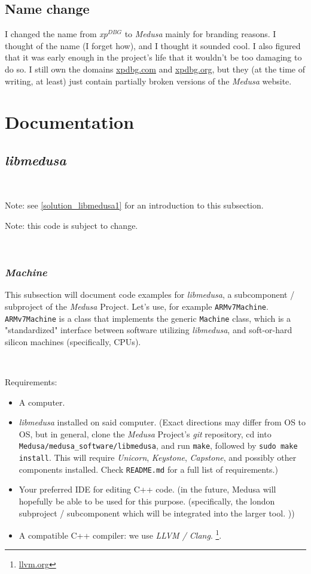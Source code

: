 \documentclass{report}
\newcommand{\xpDBG}{\textit{xp$^{DBG}$}\xspace}
\newcommand{\Medusa}{\textit{Medusa}\xspace}
\begin{document}
	\section{Name change}
	I changed the name from \xpDBG to \Medusa mainly for branding reasons. I
	thought of the name (I forget how), and I thought it sounded cool. I also
	figured that it was early enough in the project's life that it wouldn't be
	too damaging to do so. I still own the domains
	\href{https://xpdbg.com}{xpdbg.com} and \href{https://xpdbg.org}{xpdbg.org},
	but they (at the time of writing, at least) just contain partially broken
	versions of the \Medusa website.

	\chapter{Documentation}
	\section{\textit{libmedusa}}
	\

	Note: see \ref{solution_libmedusa1} for an introduction to this subsection.

	Note: this code is subject to change.

	\

	\subsection{\textit{Machine}}

	This subsection will document code examples for \textit{libmedusa}, a
	subcomponent / subproject of the \Medusa Project. Let's use, for example
	\texttt{ARMv7Machine}. \texttt{ARMv7Machine} is a class that implements the
	generic \texttt{Machine} class, which is a "standardized" interface between
	software utilizing \textit{libmedusa}, and soft-or-hard silicon machines
	(specifically, CPUs).
	\

	\

	Requirements:
	\begin{itemize}
		\item A computer.

		\item \textit{libmedusa} installed on said computer. (Exact directions
		may differ from OS to OS, but in general, clone the \Medusa Project's
		\textit{git} repository, cd into
		\texttt{Medusa/medusa\_software/libmedusa}, and run \texttt{make},
		followed by \texttt{sudo make install}. This will require
		\textit{Unicorn}, \textit{Keystone}, \textit{Capstone}, and possibly
		other components installed. Check \texttt{README.md} for a full list of
		requirements.)

		\item Your preferred IDE for editing C++ code. (in the future, Medusa
		will hopefully be able to be used for this purpose. (specifically, the
		london subproject / subcomponent which will be integrated into the
		larger tool. ))

		\item A compatible C++ compiler: we use \textit{LLVM / Clang}.
		\footnote{
			\label{llvm_clang1}
			\href{https://www.llvm.org}{llvm.org}
		}.
	\end{itemize}
\end{document}
